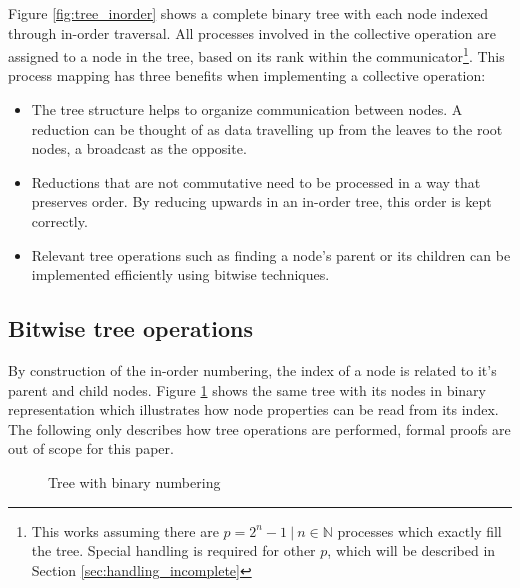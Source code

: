 \documentclass[twoside,twocolumn,hidelinks]{article}
\begin{document}
Figure \ref{fig:tree_inorder} shows a complete binary tree with each node indexed through in-order traversal. All processes involved in the collective operation are assigned to a node in the tree, based on its rank within the communicator\footnote{This works assuming there are $p = 2^n-1 \:|\: n \in \mathbb{N}$ processes which exactly fill the tree. Special handling is required for other $p$, which will be described in Section \ref{sec:handling_incomplete}}. This process mapping has three benefits when implementing a collective operation:
\begin{itemize}
      \item The tree structure helps to organize communication between nodes. A reduction can be thought of as data travelling up from the leaves to the root nodes, a broadcast as the opposite.
      \item Reductions that are not commutative need to be processed in a way that preserves order. By reducing upwards in an in-order tree, this order is kept correctly.
      \item Relevant tree operations such as finding a node's parent or its children can be implemented efficiently using bitwise techniques.
\end{itemize}

\subsection{Bitwise tree operations}\label{sec:bitwise_tree_operations}
By construction of the in-order numbering, the index of a node is related to it's parent and child nodes. Figure \ref{fig:tree_inorder_binary} shows the same tree with its nodes in binary representation which illustrates how node properties can be read from its index. The following only describes how tree operations are performed, formal proofs are out of scope for this paper.

\begin{figure}
      \centering
      \caption{Tree with binary numbering}
      \label{fig:tree_inorder_binary}
\end{figure}
\end{document}
